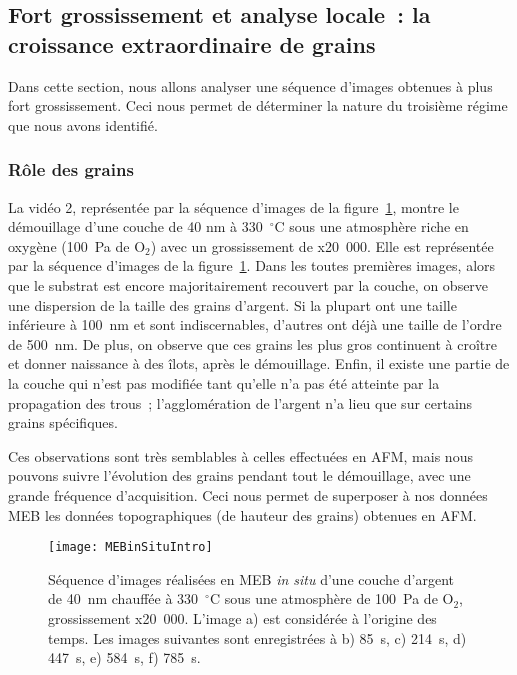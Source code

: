 \subsection{Fort grossissement et analyse locale~: la croissance extraordinaire de grains}
Dans cette section, nous allons analyser une séquence d'images obtenues à plus fort grossissement. Ceci nous permet de déterminer la nature du troisième régime que nous avons identifié.\par

\subsubsection{Rôle des grains}
La vidéo 2, représentée par la séquence d'images de la figure~\ref{MEBinSituIntro}, montre le démouillage d'une couche de 40 nm à 330~$^\circ$C sous une atmosphère riche en oxygène (100~Pa de O$_2$) avec un grossissement de x20~000. Elle est représentée par la séquence d'images de la figure~\ref{MEBinSituIntro}. Dans les toutes premières images, alors que le substrat est encore majoritairement recouvert par la couche, on observe une dispersion de la taille des grains d'argent. Si la plupart ont une taille inférieure à 100~nm et sont indiscernables, d'autres ont déjà une taille de l'ordre de 500~nm. De plus, on observe que ces grains les plus gros continuent à croître et donner naissance à des îlots, après le démouillage. Enfin, il existe une partie de la couche qui n'est pas modifiée tant qu'elle n'a pas été atteinte par la propagation des trous~; l'agglomération de l'argent n'a lieu que sur certains grains spécifiques.\par
Ces observations sont très semblables à celles effectuées en AFM, mais nous pouvons suivre l'évolution des grains pendant tout le démouillage, avec une grande fréquence d'acquisition. Ceci nous permet de superposer à nos données MEB les données topographiques (de hauteur des grains) obtenues en AFM.\par 


\begin{figure}[!htb]
	\centering
	\texttt{[image: MEBinSituIntro]}
	\caption{Séquence d'images réalisées en MEB \textit{in situ} d'une couche d'argent de 40~nm chauffée à 330~$^\circ$C sous une atmosphère de 100~Pa de O$_2$, grossissement x20~000. L'image a) est considérée à l'origine des temps. Les images suivantes sont enregistrées à b) 85~s, c) 214~s, d) 447~s, e) 584~s, f) 785~s.}
	\label{MEBinSituIntro}
\end{figure}

